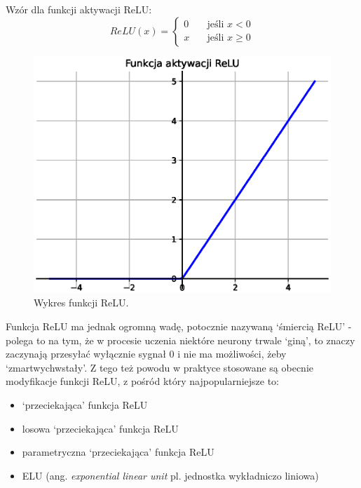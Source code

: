 \documentclass[a4paper,11pt]{article}
\begin{document}
    \bigskip

    \noindent
    \begin{minipage}[H]{\textwidth}
        \setlength\parindent{17pt} Wzór dla funkcji aktywacji ReLU: \\
        \begin{equation}
            \label{eq:relu}
            ReLU(x) =
            \begin{cases}
                0 & \quad \text{jeśli } x < 0 \\
                x & \quad \text{jeśli } x \geq 0
            \end{cases}
        \end{equation}
    \end{minipage}

    \bigskip

    \begin{figure}[H]
        \label{fig:relu}
        \centering
        \includegraphics[width=\textwidth]{relu}
        \caption{Wykres funkcji ReLU.}
    \end{figure}

    \bigskip

    Funkcja ReLU ma jednak ogromną wadę, potocznie nazywaną `śmiercią ReLU' - polega to na tym, że w procesie uczenia niektóre neurony trwale `giną', to znaczy zaczynają przesyłać wyłącznie sygnał 0 i nie ma możliwości, żeby `zmartwychwstały'\cite{UczenieMaszynowe2018}. Z tego też powodu w praktyce stosowane są obecnie modyfikacje funkcji ReLU, z pośród który najpopularniejsze to:
    \begin{itemize}
        \item `przeciekająca' funkcja ReLU
        \item losowa `przeciekająca' funkcja ReLU
        \item parametryczna `przeciekająca' funkcja ReLU
        \item ELU (ang. \textit{exponential linear unit} pl. jednostka wykładniczo liniowa)
    \end{itemize}
\end{document}
